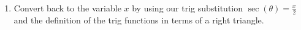 \documentclass[12pt]{article}
\begin{document}
\begin{enumerate}
\begin{enumerate}
\vfill
\vfill
\vfill

\item Convert back to the variable $x$ by using our trig substitution $\sec(\theta)=\frac{x}{2}$ and the definition of the trig functions in terms of a right triangle.

\medskip
{}



\end{enumerate}
\end{enumerate} 
\end{document}
